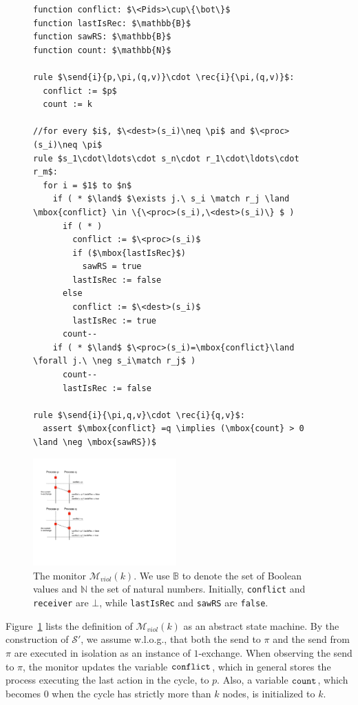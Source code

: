 \begin{figure}
\begin{minipage}{6.5cm}
\begin{lstlisting}
function conflict: $\<Pids>\cup\{\bot\}$
function lastIsRec: $\mathbb{B}$
function sawRS: $\mathbb{B}$
function count: $\mathbb{N}$

rule $\send{i}{p,\pi,(q,v)}\cdot \rec{i}{\pi,(q,v)}$:
  conflict := $p$
  count := k

//for every $i$, $\<dest>(s_i)\neq \pi$ and $\<proc>(s_i)\neq \pi$
rule $s_1\cdot\ldots\cdot s_n\cdot r_1\cdot\ldots\cdot r_m$:
  for i = $1$ to $n$
    if ( * $\land$ $\exists j.\ s_i \match r_j \land \mbox{conflict} \in \{\<proc>(s_i),\<dest>(s_i)\} $ )
      if ( * )
        conflict := $\<proc>(s_i)$
        if ($\mbox{lastIsRec}$)
          sawRS = true
        lastIsRec := false
      else 
        conflict := $\<dest>(s_i)$
        lastIsRec := true
      count--
    if ( * $\land$ $\<proc>(s_i)=\mbox{conflict}\land \forall j.\ \neg s_i\match r_j$ )
      count--
      lastIsRec := false

rule $\send{i}{\pi,q,v}\cdot \rec{i}{q,v}$:
  assert $\mbox{conflict} =q \implies (\mbox{count} > 0 \land \neg \mbox{sawRS})$
\end{lstlisting}
\end{minipage}
\hspace{5mm}
\begin{minipage}{5.5cm}
\includegraphics[width=5.5cm]{Borderline-mviol.pdf}
\end{minipage}
\caption{The monitor $\mathcal{M}_{\mathit{viol}}(k)$. We use $\mathbb{B}$ to denote the set of Boolean values and $\mathbb{N}$ the set of natural numbers. Initially, {\tt conflict} and {\tt receiver} are $\bot$, while {\tt lastIsRec} and {\tt sawRS} are {\tt false}.}
\label{fig:mon_viol}
\end{figure}

Figure~\ref{fig:mon_viol} lists the definition of $\mathcal{M}_{\mathit{viol}}(k)$ as an abstract state machine. By the construction of $\mathcal{S'}$, we assume w.l.o.g., that both the send to $\pi$ and the send from $\pi$ are executed in isolation as an instance of $1$-exchange.
When observing the send to $\pi$, the monitor updates the variable ${\tt conflict}$, which in general stores the process executing the last action in the cycle, to $p$. Also, a variable ${\tt count}$, which becomes $0$ when the cycle has strictly more than $k$ nodes, is initialized to $k$. 

